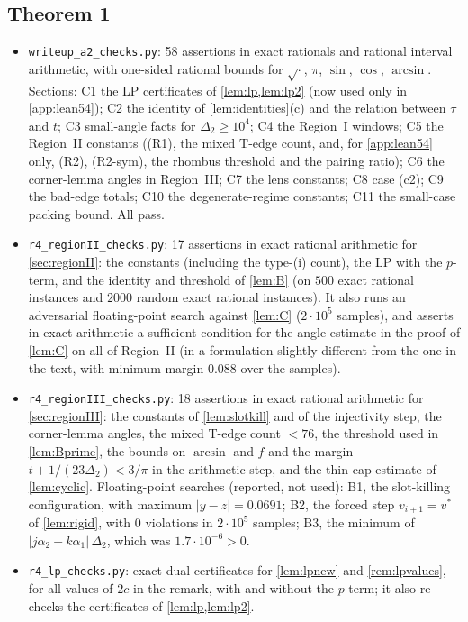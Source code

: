 \documentclass[11pt]{amsart}
\theoremstyle{definition}
\theoremstyle{remark}
\newcommand{\Dt}{\Delta_2}
\begin{document}
\subsection*{Theorem 1}
\begin{itemize}[leftmargin=2em]
\item \texttt{writeup\_a2\_checks.py}: 58 assertions in exact rationals and rational interval arithmetic, with one-sided rational bounds for $\sqrt{\cdot}$, $\pi$, $\sin$, $\cos$, $\arcsin$. Sections: C1 the LP certificates of \cref{lem:lp,lem:lp2} (now used only in \cref{app:lean54}); C2 the identity of \cref{lem:identities}(c) and the relation between $\tau$ and $t$; C3 small-angle facts for $\Dt\ge10^4$; C4 the Region~I windows; C5 the Region~II constants ((R1), the mixed T-edge count, and, for \cref{app:lean54} only, (R2), (R2-sym), the rhombus threshold and the pairing ratio); C6 the corner-lemma angles in Region~III; C7 the lens constants; C8 case (c2); C9 the bad-edge totals; C10 the degenerate-regime constants; C11 the small-case packing bound. All pass.
\item \texttt{r4\_regionII\_checks.py}: 17 assertions in exact rational arithmetic for \cref{sec:regionII}: the constants (including the type-(i) count), the LP with the $p$-term, and the identity and threshold of \cref{lem:B} (on $500$ exact rational instances and $2000$ random exact rational instances). It also runs an adversarial floating-point search against \cref{lem:C} ($2\cdot10^5$ samples), and asserts in exact arithmetic a sufficient condition for the angle estimate in the proof of \cref{lem:C} on all of Region~II (in a formulation slightly different from the one in the text, with minimum margin $0.088$ over the samples).
\item \texttt{r4\_regionIII\_checks.py}: 18 assertions in exact rational arithmetic for \cref{sec:regionIII}: the constants of \cref{lem:slotkill} and of the injectivity step, the corner-lemma angles, the mixed T-edge count $<76$, the threshold used in \cref{lem:Bprime}, the bounds on $\arcsin$ and $f$ and the margin $t+1/(23\Dt)<3/\pi$ in the arithmetic step, and the thin-cap estimate of \cref{lem:cyclic}. Floating-point searches (reported, not used): B1, the slot-killing configuration, with maximum $|y-z|=0.0691$; B2, the forced step $v_{i+1}=v^*$ of \cref{lem:rigid}, with $0$ violations in $2\cdot10^5$ samples; B3, the minimum of $|j\alpha_2-k\alpha_1|\,\Dt$, which was $1.7\cdot10^{-6}>0$.
\item \texttt{r4\_lp\_checks.py}: exact dual certificates for \cref{lem:lpnew} and \cref{rem:lpvalues}, for all values of $2c$ in the remark, with and without the $p$-term; it also re-checks the certificates of \cref{lem:lp,lem:lp2}.

\end{itemize}
\end{document}
